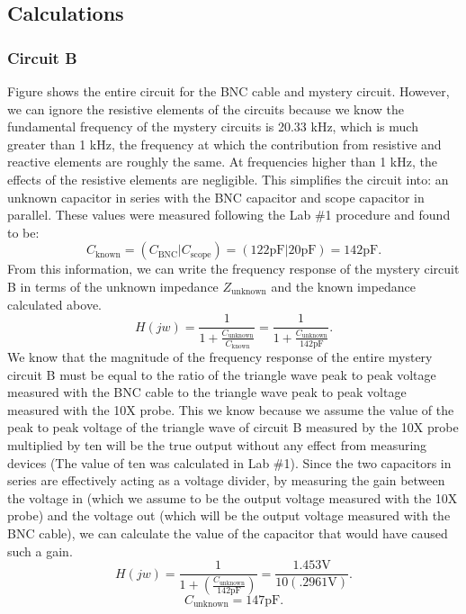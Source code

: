 \documentclass[12pt,letterpaper]{report}
\begin{document}
\subsection*{Calculations}

\subsubsection*{Circuit B}
Figure 
shows the entire circuit for the BNC cable and mystery circuit. However,
we can ignore the resistive elements of the circuits because we know the fundamental frequency of the mystery circuits is 20.33 kHz, which is much greater than 1 kHz, the frequency at which the contribution from resistive and reactive elements are roughly the same. At frequencies higher than 1 kHz, the effects of the resistive elements are negligible. This simplifies the circuit into: an unknown capacitor in series with the BNC capacitor and scope capacitor in parallel. These values were measured following the Lab \#1 procedure and found to be:
$$
C_{\text{known}} = (C_{ \text{BNC}} | C_{\text{scope}}) = (122 \text{pF} | 20 \text{pF}) = 142 \text{pF}.
$$
From this information, we can write the frequency response of the mystery circuit B in terms of the unknown impedance $Z_{\text{unknown}}$ and the known impedance calculated above.
$$
H(jw) = \frac{1}{1+\frac{C_{\text{unknown}}}{C_{\text{known}}}} = \frac{1}{1+\frac{C_{\text{unknown}}}{142 \text{pF}}}.
$$
We know that the magnitude of the frequency response of the entire mystery circuit B must be equal to the ratio of the triangle wave peak to peak voltage measured with the BNC cable to the triangle wave peak to peak voltage measured with the 10X probe. This we know because we assume the value of the peak to peak voltage of the triangle wave of circuit B measured by the 10X probe multiplied by ten will be the true output without any effect from measuring devices (The value of ten was calculated in Lab \#1). Since the two capacitors in series are effectively acting as a voltage divider, by measuring the gain between the voltage in (which we assume to be the output voltage measured with the 10X probe) and the voltage out (which will be the output voltage measured with the BNC cable), we can calculate the value of the capacitor that would have caused such a gain.
$$
H(jw) = \frac{1}{1+(\frac{C_{\text{unknown}}}{142 \text{pF}})} = \frac{1.453 \text{V}}{10(.2961\text{V})}.
$$
$$
C_{\text{unknown}} = 147 \text{pF}.
$$
\end{document}
